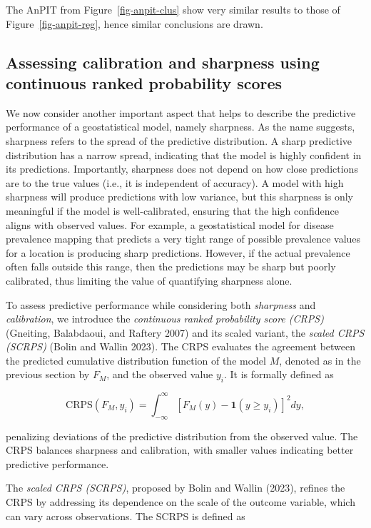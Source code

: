 \documentclass[
  letterpaper,
]{krantz}
\begin{document}
The AnPIT from Figure~\ref{fig-anpit-clus} show very similar results to
those of Figure~\ref{fig-anpit-reg}, hence similar conclusions are
drawn.

\subsection{Assessing calibration and sharpness using continuous ranked
probability
scores}\label{assessing-calibration-and-sharpness-using-continuous-ranked-probability-scores}

We now consider another important aspect that helps to describe the
predictive performance of a geostatistical model, namely sharpness. As
the name suggests, sharpness refers to the spread of the predictive
distribution. A sharp predictive distribution has a narrow spread,
indicating that the model is highly confident in its predictions.
Importantly, sharpness does not depend on how close predictions are to
the true values (i.e., it is independent of accuracy). A model with high
sharpness will produce predictions with low variance, but this sharpness
is only meaningful if the model is well-calibrated, ensuring that the
high confidence aligns with observed values. For example, a
geostatistical model for disease prevalence mapping that predicts a very
tight range of possible prevalence values for a location is producing
sharp predictions. However, if the actual prevalence often falls outside
this range, then the predictions may be sharp but poorly calibrated,
thus limiting the value of quantifying sharpness alone.

To assess predictive performance while considering both \emph{sharpness}
and \emph{calibration}, we introduce the \emph{continuous ranked
probability score (CRPS)} (Gneiting, Balabdaoui, and Raftery 2007) and
its scaled variant, the \emph{scaled CRPS (SCRPS)} (Bolin and Wallin
2023). The CRPS evaluates the agreement between the predicted cumulative
distribution function of the model \(M\), denoted as in the previous
section by \(F_M\), and the observed value \(y_i\). It is formally
defined as

\[
\text{CRPS}(F_M, y_i) = \int_{-\infty}^\infty \left[ F_M(y) - \mathbf{1}(y \geq y_i) \right]^2 dy,
\]

penalizing deviations of the predictive distribution from the observed
value. The CRPS balances sharpness and calibration, with smaller values
indicating better predictive performance.

The \emph{scaled CRPS (SCRPS)}, proposed by Bolin and Wallin (2023),
refines the CRPS by addressing its dependence on the scale of the
outcome variable, which can vary across observations. The SCRPS is
defined as
\end{document}

